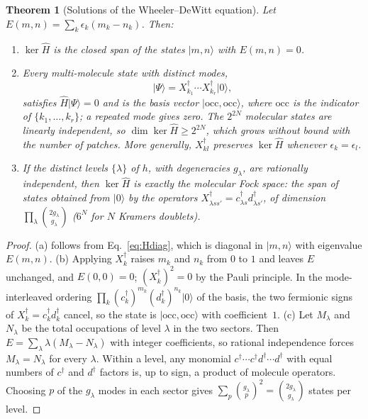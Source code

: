 \documentclass[reprint,aps,prd,amsmath,amssymb,superscriptaddress,nofootinbib,floatfix]{revtex4-2}
\theoremstyle{plain}
\newtheorem{theorem}{Theorem}
\theoremstyle{definition}
\theoremstyle{remark}
\newcommand{\Mol}{\ensuremath{X}}                 %
\newcommand{\ket}[1]{\ensuremath{|#1\rangle}}
\newcommand{\Hc}{\hat{H}}
\begin{document}
\begin{theorem}[Solutions of the Wheeler--DeWitt equation]
\label{thm:kernel}
Let $E(m,n)=\sum_k\epsilon_k(m_k-n_k)$. Then:
\begin{enumerate}
\item[(a)] $\ker\Hc$ is the closed span of the states $\ket{m,n}$ with $E(m,n)=0$.
\item[(b)] Every multi-molecule state with distinct modes,
\[
\ket\Psi=\Mol^\dagger_{k_1}\cdots\Mol^\dagger_{k_r}\ket0 ,
\]
satisfies $\Hc\ket\Psi=0$ and is the basis vector $\ket{\mathrm{occ},\mathrm{occ}}$, where $\mathrm{occ}$ is the indicator of
$\{k_1,\ldots,k_r\}$; a repeated mode gives zero. The $2^{2N}$ molecular states are linearly independent, so
$\dim\ker\Hc\ge2^{2N}$, which grows without bound with the number of patches. More generally, $\Mol^\dagger_{kl}$ preserves
$\ker\Hc$ whenever $\epsilon_k=\epsilon_l$.
\item[(c)] If the distinct levels $\{\lambda\}$ of $h$, with degeneracies $g_\lambda$, are rationally independent, then $\ker\Hc$
is exactly the \emph{molecular Fock space}: the span of states obtained from $\ket0$ by the operators
$\Mol^\dagger_{\lambda ss'}=c^\dagger_{\lambda s}d^\dagger_{\lambda s'}$, of dimension $\prod_\lambda\binom{2g_\lambda}{g_\lambda}$ ($6^N$ for $N$ Kramers
doublets).
\end{enumerate}
\end{theorem}
\begin{proof}
(a) follows from Eq.~\eqref{eq:Hdiag}, which is diagonal in $\ket{m,n}$ with eigenvalue
$E(m,n)$. (b) Applying $\Mol^\dagger_k$ raises $m_k$ and $n_k$ from $0$ to $1$ and leaves $E$ unchanged, and $E(0,0)=0$;
$(\Mol^\dagger_k)^2=0$ by the Pauli principle. In the mode-interleaved ordering $\prod_k(c_k^\dagger)^{m_k}(d_k^\dagger)^{n_k}\ket0$ of
the basis, the two fermionic signs of $\Mol^\dagger_k=c_k^\dagger d_k^\dagger$ cancel, so the state is $\ket{\mathrm{occ},\mathrm{occ}}$ with
coefficient~$1$. (c) Let $M_\lambda$ and $N_\lambda$ be the total occupations of
level $\lambda$ in the two sectors. Then $E=\sum_\lambda\lambda(M_\lambda-N_\lambda)$ with integer coefficients,
so rational independence forces $M_\lambda=N_\lambda$ for every $\lambda$. Within a level, any monomial
$c^\dagger\cdots c^\dagger d^\dagger\cdots d^\dagger$ with equal numbers of $c^\dagger$ and $d^\dagger$ factors
is, up to sign, a product of molecule operators. Choosing $p$ of the $g_\lambda$ modes in each sector gives
$\sum_p\binom{g_\lambda}{p}^2=\binom{2g_\lambda}{g_\lambda}$ states per level.
\end{proof}
\end{document}
